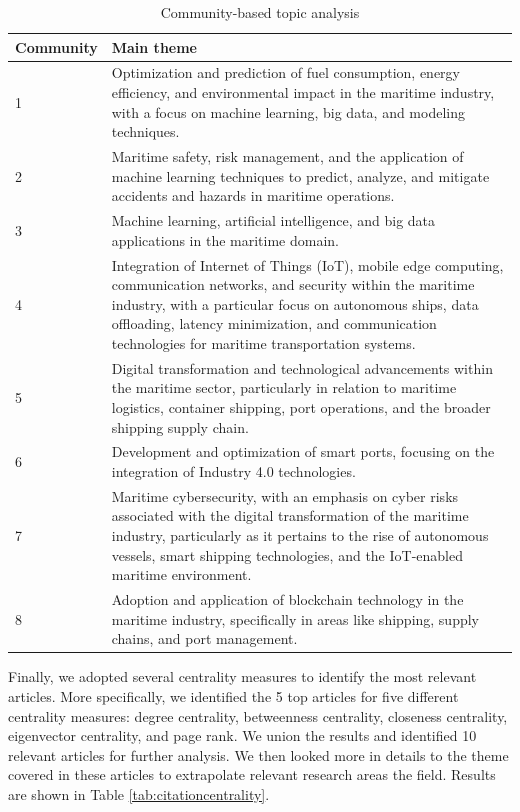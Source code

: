 \documentclass[a4paper, review, endfloat, authoryear]{elsarticle}
\begin{document}
	\begin{table}[h]
		\centering
		\caption{Community-based topic analysis}
		\begin{tabularx}{\linewidth}{p{2cm}X}
			\hline
			Community & Main theme \\
			\hline
			1 & Optimization and prediction of fuel consumption, energy efficiency, and environmental impact in the maritime industry, with a focus on machine learning, big data, and modeling techniques.\\
			2 & Maritime safety, risk management, and the application of machine learning techniques to predict, analyze, and mitigate accidents and hazards in maritime operations. \\
			3 & Machine learning, artificial intelligence, and big data applications in the maritime domain.\\
			4 & Integration of Internet of Things (IoT), mobile edge computing, communication networks, and security within the maritime industry, with a particular focus on autonomous ships, data offloading, latency minimization, and communication technologies for maritime transportation systems.\\
			5 & Digital transformation and technological advancements within the maritime sector, particularly in relation to maritime logistics, container shipping, port operations, and the broader shipping supply chain.\\
			6 & Development and optimization of smart ports, focusing on the integration of Industry 4.0 technologies.\\
			7 & Maritime cybersecurity, with an emphasis on cyber risks associated with the digital transformation of the maritime industry, particularly as it pertains to the rise of autonomous vessels, smart shipping technologies, and the IoT-enabled maritime environment.\\
			8 & Adoption and application of blockchain technology in the maritime industry, specifically in areas like shipping, supply chains, and port management.\\
			\hline
		\end{tabularx}
		\label{tab:citationthemes}
	\end{table}
	
	Finally, we adopted several centrality measures to identify the most relevant articles. More specifically, we identified the 5 top articles for five different centrality measures: degree centrality, betweenness centrality, closeness centrality, eigenvector centrality, and page rank. We union the results and identified 10 relevant articles for further analysis. We then looked more in details to the theme covered in these articles to extrapolate relevant research areas the field. Results are shown in Table \ref{tab:citationcentrality}.
	
\end{document}
